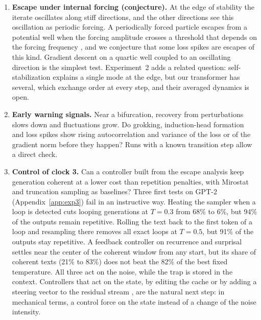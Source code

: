 \begin{enumerate}[label=\textbf{OP\,\arabic*.}, leftmargin=*, itemsep=3pt]
\item \textbf{Escape under internal forcing (conjecture).} At the edge of stability the iterate oscillates along stiff directions, and the other directions see this oscillation as periodic forcing. A periodically forced particle escapes from a potential well when the forcing amplitude crosses a threshold that depends on the forcing frequency \citep{farid2019escape,farid2022escape}, and we conjecture that some loss spikes are escapes of this kind. Gradient descent on a quartic well coupled to an oscillating direction is the simplest test. Experiment~2 adds a related question: self-stabilization \citep{damian2022selfstabilization} explains a single mode at the edge, but our transformer has several, which exchange order at every step, and their averaged dynamics is open.

\item \textbf{Early warning signals.} Near a bifurcation, recovery from perturbations slows down and fluctuations grow. Do grokking, induction-head formation and loss spikes show rising autocorrelation and variance of the loss or of the gradient norm before they happen? Runs with a known transition step \citep{power2022grokking,olsson2022incontext} allow a direct check.

\item \textbf{Control of clock 3.} Can a controller built from the escape analysis keep generation coherent at a lower cost than repetition penalties, with Mirostat \citep{basu2020mirostat} and truncation sampling \citep{hewitt2022truncation} as baselines? Three first tests on GPT-2 (Appendix~\ref{app:exp3}) fail in an instructive way. Heating the sampler when a loop is detected cuts looping generations at $T=0.3$ from 68\% to 6\%, but 94\% of the outputs remain repetitive. Rolling the text back to the first token of a loop and resampling there removes all exact loops at $T=0.5$, but 91\% of the outputs stay repetitive. A feedback controller on recurrence and surprisal settles near the center of the coherent window from any start, but its share of coherent texts (21\% to 83\%) does not beat the 82\% of the best fixed temperature. All three act on the noise, while the trap is stored in the context. Controllers that act on the state, by editing the cache or by adding a steering vector to the residual stream \citep{turner2023steering,zou2023representation}, are the natural next step: in mechanical terms, a control force on the state instead of a change of the noise intensity.
\end{enumerate}
